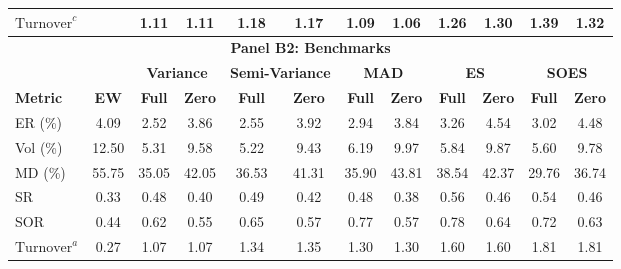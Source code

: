 \begin{table}[bp]
{\begin{tabular}{l*{11}{c}}
    $\text{Turnover}^c$      &                  & 1.11             & 1.11             & 1.18             & 1.17             & 1.09             & 1.06             & 1.26             & 1.30             & 1.39             & 1.32 \\
    \midrule
    \multicolumn{12}{c}{\textbf{Panel B2: Benchmarks}} \\
    \midrule
                             &                  & \multicolumn{2}{c}{\textbf{Variance}} & \multicolumn{2}{c}{\textbf{Semi-Variance}} & \multicolumn{2}{c}{\textbf{MAD}} & \multicolumn{2}{c}{\textbf{ES}} & \multicolumn{2}{c}{\textbf{SOES}} \\
    \cmidrule(lr){3-4} \cmidrule(lr){5-6} \cmidrule(lr){7-8} \cmidrule(lr){9-10} \cmidrule(lr){11-12}
    \textbf{Metric}          & \textbf{EW}      & \textbf{Full}    & \textbf{Zero}    & \textbf{Full}    & \textbf{Zero}    & \textbf{Full}    & \textbf{Zero}    & \textbf{Full}    & \textbf{Zero}    & \textbf{Full}    & \textbf{Zero} \\
    \midrule
    ER (\%)                  & 4.09             & 2.52             & 3.86             & 2.55             & 3.92             & 2.94             & 3.84             & 3.26             & 4.54             & 3.02             & 4.48 \\
    Vol (\%)                 & 12.50            & 5.31             & 9.58             & 5.22             & 9.43             & 6.19             & 9.97             & 5.84             & 9.87             & 5.60             & 9.78 \\
    MD (\%)                  & 55.75            & 35.05            & 42.05            & 36.53            & 41.31            & 35.90            & 43.81            & 38.54            & 42.37            & 29.76            & 36.74 \\
    SR                       & 0.33             & 0.48             & 0.40             & 0.49             & 0.42             & 0.48             & 0.38             & 0.56             & 0.46             & 0.54             & 0.46 \\
    SOR                      & 0.44             & 0.62             & 0.55             & 0.65             & 0.57             & 0.77             & 0.57             & 0.78             & 0.64             & 0.72             & 0.63 \\
    $\text{Turnover}^a$      & 0.27             & 1.07             & 1.07             & 1.34             & 1.35             & 1.30             & 1.30             & 1.60             & 1.60             & 1.81             & 1.81 \\

\end{tabular}}
\end{table}
